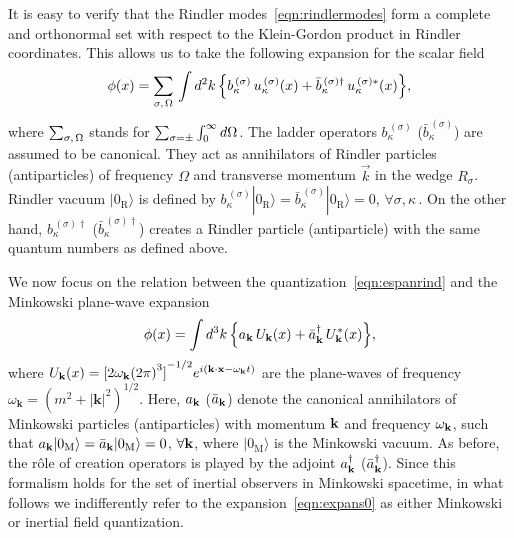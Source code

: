 \documentclass[floats,prd,aps,amssymb,nofootinbib,showkeys]{revtex4}
\newcommand{\be}{\begin{equation}}\newcommand{\ee}{\end{equation}}
\def\uuu{U}
\def\uuu{U}
\begin{document}
It is easy to verify that the Rindler modes~\eqref{eqn:rindlermodes} 
form a complete and orthonormal set with respect 
to the Klein-Gordon product in Rindler coordinates. 
This allows us to take
the following expansion for the scalar field~\cite{Takagi}
\begin{equation}
\phi(x)=\sum_{\sigma,\hspace{0.4mm}\Omega}\,\int d^{2}k\,\Big\{{b^{\,(\sigma)}_\kappa}\, u_\kappa^{\,(\sigma)}(x)+{\bar b^{\,(\sigma)\dagger}_\kappa}\, u_\kappa^{\,(\sigma)*}(x) \Big\},
\label{eqn:espanrind}
\end{equation}
where $\sum_{\sigma,\hspace{0.4mm}\Omega}$
stands for $\sum_{\sigma=\pm}\int_{0}^{\infty}d\Omega\hspace{0.2mm}$. The ladder operators ${b^{\,(\sigma)}_\kappa}$ (${\bar b^{\,(\sigma)}_\kappa}$) are assumed to be canonical. They act as annihilators of Rindler particles (antiparticles) 
of frequency $\Omega$ and transverse momentum $\vec{k}$
in the wedge $R_{\sigma}$. Rindler vacuum $|0_{\mathrm{R}}\rangle$ is defined by $b_\kappa^{\,(\sigma)}|0_{\mathrm{R}}\rangle=\bar b_\kappa^{\,(\sigma)}|0_{\mathrm{R}}\rangle=0$, $\forall\sigma, \kappa\,$. On the other hand, ${b^{\,(\sigma)\dagger}_\kappa}$ (${\bar b^{\,(\sigma)\dagger}_\kappa}$) creates a Rindler particle (antiparticle) with the same quantum numbers as defined above.  


We now focus on the relation between
the quantization~\eqref{eqn:espanrind} and 
the Minkowski plane-wave expansion
\be
\phi(x)=\int d^{3}{k}\, \Big\{a_{\textbf{k}}\, \uuu_{\textbf{k}}(x)+ {\bar a_\textbf{k}}^\dagger\, \uuu_\textbf{k}^{\hspace{0.1mm}*}(x) \Big\},
\label{eqn:expans0}
\end{equation}
where $U_{\bf {k}}(x)={[{2\omega_{{\bf {k}}}{(2\pi)}^{3}}]}^{-1/2}e^{i\left({\bf {k}}\cdot{\bf {x}}-\omega_{{\bf {k}}} t\right)}$ are the plane-waves of frequency
$\omega_{\textbf{k}}=({m^2+|\textbf{k}|^2})^{1/2}$. Here, 
$a_{{\bf {k}}}$ ($\bar a_{{\bf {k}}}$) denote
the canonical annihilators of 
Minkowski particles (antiparticles) with momentum
${\bf {k}}$ and frequency $\omega_{{\bf {k}}}$, such that
$a_{\bf {k}}|0_{\mathrm{M}}\rangle=\bar a_{\bf {k}}|0_{\mathrm{M}}\rangle=0$, $\forall {\bf {k}}$,
where $|0_{\mathrm{M}}\rangle$ is the Minkowski vacuum.
As before, the r\^ole of creation operators
is played by the adjoint $a^\dagger_{\bf {k}}$ ($\bar a^\dagger_{\bf {k}}$). 
Since this formalism holds
for the set of inertial observers in Minkowski spacetime, 
in what follows we indifferently refer to the expansion~\eqref{eqn:expans0} as either Minkowski or inertial field
quantization. 
\end{document}
